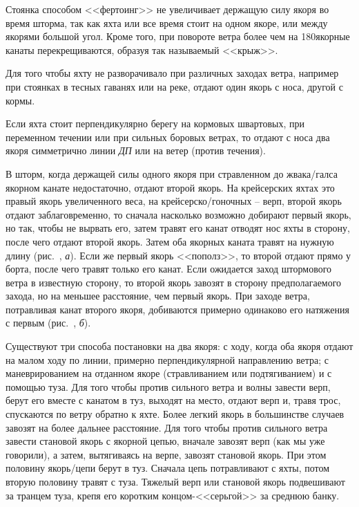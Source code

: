 Стоянка способом <<фертоинг>> не увеличивает держащую силу якоря во время шторма, так как яхта или все время стоит на одном якоре, или между якорями большой угол. Кроме того, при повороте ветра более чем на 180\gr якорные канаты перекрещиваются, образуя так называемый <<крыж>>.

Для того чтобы яхту не разворачивало при различных заходах ветра, например при стоянках в тесных гаванях или на реке, отдают один якорь с носа, другой с кормы.

Если яхта стоит перпендикулярно берегу на кормовых швартовых, при переменном течении или при сильных боровых ветрах, то отдают с носа два якоря симметрично линии \textit{ДП} или на ветер (против течения).

В шторм, когда держащей силы одного якоря при стравленном до жвака\-/галса якорном канате недостаточно, отдают второй якорь. На крейсерских яхтах это правый якорь увеличенного веса, на крейсерско\-/гоночных \--- верп, второй якорь отдают заблаговременно, то сначала насколько возможно добирают первый якорь, но так, чтобы не вырвать его, затем травят его канат отводят нос яхты в сторону, после чего отдают второй якорь. Затем оба якорных каната травят на нужную длину (рис.~, \textit{а}). Если же первый якорь <<пополз>>, то второй отдают прямо у борта, после чего травят только его канат. Если ожидается заход штормового ветра в известную сторону, то второй якорь завозят в сторону предполагаемого захода, но на меньшее расстояние, чем первый якорь. При заходе ветра, потравливая канат второго якоря, добиваются примерно одинаково его натяжения с первым (рис.~, \textit{б}).

Существуют три способа постановки на два якоря: с ходу, когда оба якоря отдают на малом ходу по линии, примерно перпендикулярной направлению ветра; с маневрированием на отданном якоре (стравливанием или подтягиванием) и с помощью туза. Для того чтобы против сильного ветра и волны завести верп, берут его вместе с канатом в туз, выходят на место, отдают верп и, травя трос, спускаются по ветру обратно к яхте. Более легкий якорь в большинстве случаев завозят на более дальнее расстояние. Для того чтобы против сильного ветра завести становой якорь с якорной цепью, вначале завозят верп (как мы уже говорили), а затем, вытягиваясь на верпе, завозят становой якорь. При этом половину якорь\-/цепи берут в туз. Сначала цепь потравливают с яхты, потом вторую половину травят с туза. Тяжелый верп или становой якорь подвешивают за транцем туза, крепя его коротким концом-<<серьгой>> за среднюю банку.

